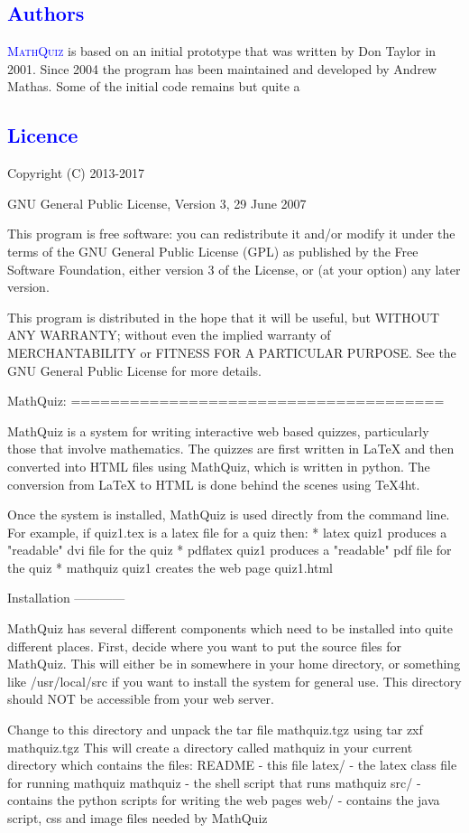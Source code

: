 \documentclass[svgnames]{article}
\newcommand\Section[1]{\subsection{\textcolor{blue}{#1}}}
\def\MathQuiz{\textcolor{blue}{\textsc{MathQuiz}}\xspace}
\begin{document}
    \Section{Authors}

\MathQuiz is based on an initial prototype that was written by Don Taylor in
2001. Since 2004 the program has been maintained and developed by Andrew
Mathas. Some of the initial code remains but quite a

\Section{Licence}

Copyright (C) 2013-2017

GNU General Public License, Version 3, 29 June 2007

This program is free software: you can redistribute it and/or modify it under
the terms of the GNU General Public License (GPL) as published by the Free
Software Foundation, either version 3 of the License, or (at your option) any
later version.

This program is distributed in the hope that it will be useful, but WITHOUT ANY
WARRANTY; without even the implied warranty of MERCHANTABILITY or FITNESS FOR A
PARTICULAR PURPOSE.  See the GNU General Public License for more details.



MathQuiz:
======================================

MathQuiz is a system for writing interactive web based quizzes, particularly
those that involve mathematics. The quizzes are first written in LaTeX and
then converted into HTML files using MathQuiz, which is written in python. The
conversion from LaTeX to HTML is done behind the scenes using TeX4ht.

Once the system is installed, MathQuiz is used directly from the
command line. For example, if quiz1.tex is a latex file for a quiz then:
    * latex quiz1         produces a "readable" dvi file for the quiz
    * pdflatex quiz1      produces a "readable" pdf file for the quiz
    * mathquiz quiz1      creates the web page quiz1.html


Installation
------------

MathQuiz has several different components which need to be installed into quite
different places. First, decide where you want to put the source files for MathQuiz.
This will either be in somewhere in your home directory, or something like
/usr/local/src if you want to install the system for general use. This directory
should NOT be accessible from your web server.

Change to this directory and unpack the tar file mathquiz.tgz using
    tar zxf mathquiz.tgz
This will create a directory called mathquiz in your current directory which contains
the files:
    README    -  this file
    latex/    -  the latex class file for running mathquiz
    mathquiz  -  the shell script that runs mathquiz
    src/      -  contains the python scripts for writing the web pages
    web/      -  contains the java script, css and image files needed by MathQuiz
\end{document}
